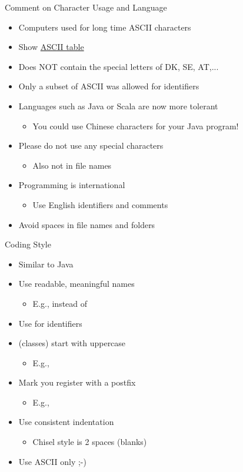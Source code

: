 \begin{frame}[fragile]{Comment on Character Usage and Language}
\begin{itemize}
\item Computers used for long time ASCII characters
\item Show \href{http://www.asciitable.com/}{ASCII table}
\item Does NOT contain the special letters of DK, SE, AT,...
\item Only a subset of ASCII was allowed for identifiers
\item Languages such as Java or Scala are now more tolerant
\begin{itemize}
\item You could use Chinese characters for your Java program!
\end{itemize}
\item Please do not use any special characters
\begin{itemize}
\item Also not in file names
\end{itemize}
\item Programming is international
\begin{itemize}
\item Use English identifiers and comments
\end{itemize}
\item Avoid spaces in file names and folders
\end{itemize}
\end{frame}

\begin{frame}[fragile]{Coding Style}
\begin{itemize}
\item Similar to Java
\item Use readable, meaningful names
\begin{itemize}
\item E.g.,  instead of 
\end{itemize}
\item Use  for identifiers
\item {} (classes) start with uppercase
\begin{itemize}
\item E.g., 
\end{itemize}
\item Mark you register with a postfix 
\begin{itemize}
\item E.g., 
\end{itemize}
\item Use consistent indentation
\begin{itemize}
\item Chisel style is 2 spaces (blanks)
\end{itemize}
\item Use ASCII only ;-)
\end{itemize}
\end{frame}

